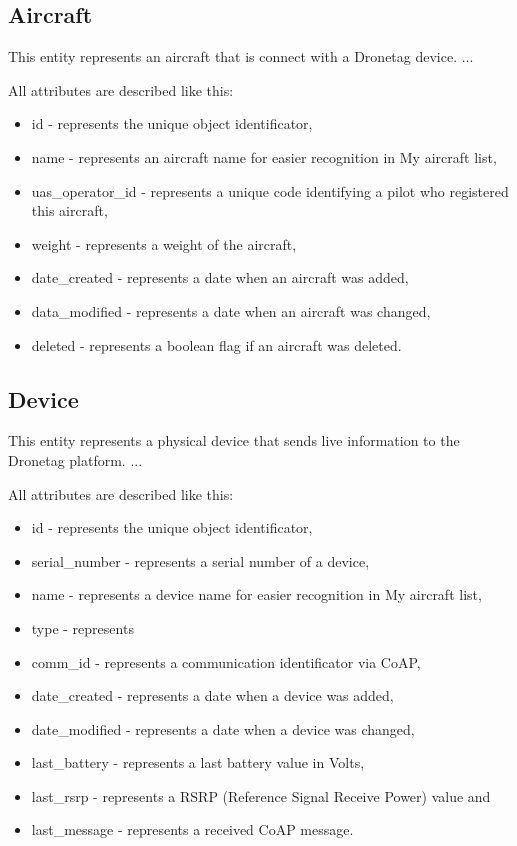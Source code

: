 \subsection{Aircraft}\label{subsec:aircraft}
This entity represents an aircraft that is connect with a Dronetag device.
... %

All attributes are described like this:
\begin{itemize}
    \item id - represents the unique object identificator,
    \item name - represents an aircraft name for easier recognition in My aircraft list,
    \item uas\_operator\_id - represents a unique code identifying a pilot who registered this aircraft,
    \item weight - represents a weight of the aircraft,
    \item date\_created - represents a date when an aircraft was added,
    \item data\_modified - represents a date when an aircraft was changed,
    \item deleted - represents a boolean flag if an aircraft was deleted.
\end{itemize}

\subsection{Device}\label{subsec:device}
This entity represents a physical device that sends live information to the Dronetag platform.
... %

All attributes are described like this:
\begin{itemize}
    \item id - represents the unique object identificator,
    \item serial\_number - represents a serial number of a device,
    \item name - represents a device name for easier recognition in My aircraft list,
    \item type - represents
    \item comm\_id - represents a communication identificator via CoAP,
    \item date\_created - represents a date when a device was added,
    \item date\_modified - represents a date when a device was changed,
    \item last\_battery - represents a last battery value in Volts,
    \item last\_rsrp - represents a RSRP (Reference Signal Receive Power) value and
    \item last\_message - represents a received CoAP message.
\end{itemize}


